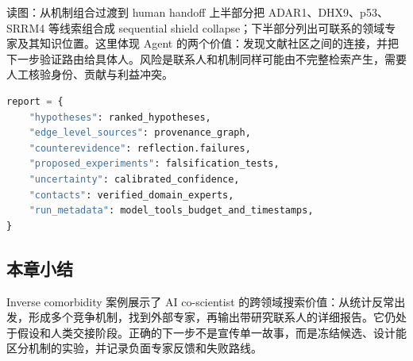
\begin{knowledgebox}{读图：从机制组合过渡到 human handoff}
上半部分把 ADAR1、DHX9、p53、SRRM4 等线索组合成 sequential shield collapse；下半部分列出可联系的领域专家及其知识位置。这里体现 Agent 的两个价值：发现文献社区之间的连接，并把下一步验证路由给具体人。风险是联系人和机制同样可能由不完整检索产生，需要人工核验身份、贡献与利益冲突。
\end{knowledgebox}

\begin{lstlisting}[language=Python,caption={长报告的可审计交付结构}]
report = {
    "hypotheses": ranked_hypotheses,
    "edge_level_sources": provenance_graph,
    "counterevidence": reflection.failures,
    "proposed_experiments": falsification_tests,
    "uncertainty": calibrated_confidence,
    "contacts": verified_domain_experts,
    "run_metadata": model_tools_budget_and_timestamps,
}
\end{lstlisting}

\subsection{本章小结}

Inverse comorbidity 案例展示了 AI co-scientist 的跨领域搜索价值：从统计反常出发，形成多个竞争机制，找到外部专家，再输出带研究联系人的详细报告。它仍处于假设和人类交接阶段。正确的下一步不是宣传单一故事，而是冻结候选、设计能区分机制的实验，并记录负面专家反馈和失败路线。

